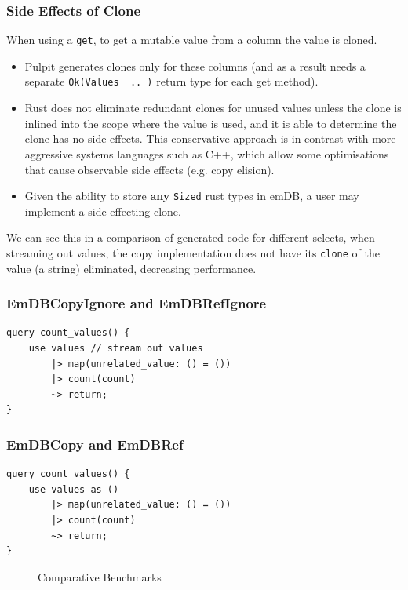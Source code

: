 \subsubsection{Side Effects of Clone}
\label{sec:clone_side_effects}
When using a \texttt{get}, to get a mutable value from a column the value is cloned.
\begin{itemize}
    \setlength\itemsep{0em}
    \item Pulpit generates clones only for these columns (and as a result needs a separate \texttt{Ok(Values { .. })} return type for each get method).
    \item Rust does not eliminate redundant clones for unused values unless the clone is inlined into the scope where the value is used, and it is able to determine the clone has no side effects.
          This conservative approach is in contrast with more aggressive systems languages such as C++, which allow some optimisations that cause observable side effects (e.g. copy elision\cite{CopyElision}).
    \item Given the ability to store \textbf{any} \texttt{Sized} rust types in emDB, a user may implement a side-effecting clone.
\end{itemize}
We can see this in a comparison of generated code for different selects, when streaming out values, the copy implementation does not have its \texttt{clone} of the value (a string) eliminated, decreasing performance.
\\
\begin{minipage}{.45\textwidth}
    \subsubsection{EmDBCopyIgnore and EmDBRefIgnore}
    \begin{verbatim}
query count_values() {
    use values // stream out values
        |> map(unrelated_value: () = ())
        |> count(count)
        ~> return;
}
    \end{verbatim}
\end{minipage}\hfill\begin{minipage}{.45\textwidth}
    \subsubsection{EmDBCopy and EmDBRef}
    \begin{verbatim}
query count_values() {
    use values as ()
        |> map(unrelated_value: () = ())
        |> count(count)
        ~> return;
}
    \end{verbatim}
\end{minipage}
\begin{figure}[h!]
    \centering
    \vspace{-0.4em}
    \resizebox{\textwidth}{!}{}
    \caption{Comparative Benchmarks}
\end{figure}

